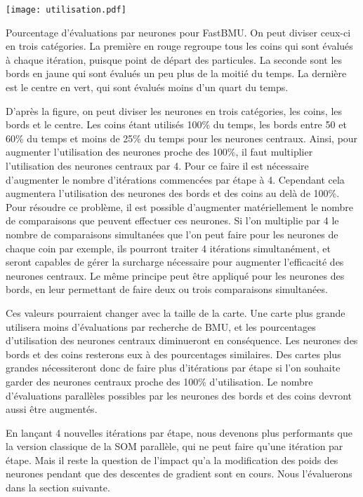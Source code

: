 	\begin{figureth}
    	\centering
    	\texttt{[image: utilisation.pdf]}
    	\caption[Pourcentage d'évaluations par neurones pour FastBMU]{Pourcentage d'évaluations par neurones pour FastBMU. On peut diviser ceux-ci en trois catégories. La première en rouge regroupe tous les coins qui sont évalués à chaque itération, puisque point de départ des particules. La seconde sont les bords en jaune qui sont évalués un peu plus de la moitié du temps. La dernière est le centre en vert, qui sont évalués moins d'un quart du temps.}
    	\label{fig:fast:eval_percent}
	\end{figureth}

	D'après la figure, on peut diviser les neurones en trois catégories, les coins, les bords et le centre. Les coins étant utilisés 100\% du temps, les bords entre 50 et 60\% du temps et moins de 25\% du temps pour les neurones centraux. Ainsi, pour augmenter l'utilisation des neurones proche des 100\%, il faut multiplier l'utilisation des neurones centraux par 4. Pour ce faire il est nécessaire d'augmenter le nombre d'itérations commencées par étape à 4. Cependant cela augmentera l'utilisation des neurones des bords et des coins au delà de 100\%. Pour résoudre ce problème, il est possible d'augmenter matériellement le nombre de comparaisons que peuvent effectuer ces neurones. Si l'on multiplie par 4 le nombre de comparaisons simultanées que l'on peut faire pour les neurones de chaque coin par exemple, ils pourront traiter 4 itérations simultanément, et seront capables de gérer la surcharge nécessaire pour augmenter l'efficacité des neurones centraux. Le même principe peut être appliqué pour les neurones des bords, en leur permettant de faire deux ou trois comparaisons simultanées.

	Ces valeurs pourraient changer avec la taille de la carte. Une carte plus grande utilisera moins d'évaluations par recherche de BMU, et les pourcentages d'utilisation des neurones centraux diminueront en conséquence. Les neurones des bords et des coins resterons eux à des pourcentages similaires. Des cartes plus grandes nécessiteront donc de faire plus d'itérations par étape si l'on souhaite garder des neurones centraux proche des 100\% d'utilisation. Le nombre d'évaluations parallèles possibles par les neurones des bords et des coins devront aussi être augmentés.

	En lançant 4 nouvelles itérations par étape, nous devenons plus performants que la version classique de la SOM parallèle, qui ne peut faire qu'une itération par étape. Mais il reste la question de l'impact qu'a la modification des poids des neurones pendant que des descentes de gradient sont en cours. Nous l'évaluerons dans la section suivante.

